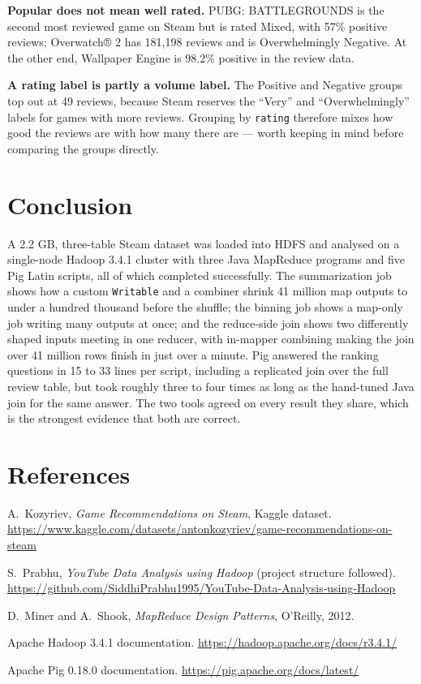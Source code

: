 \documentclass[11pt,a4paper]{article}
\newcommand{\code}[1]{\texttt{#1}}
\begin{document}
\textbf{Popular does not mean well rated.} PUBG: BATTLEGROUNDS is the second most reviewed game on Steam
but is rated Mixed, with 57\% positive reviews; Overwatch® 2 has 181,198 reviews and is Overwhelmingly
Negative. At the other end, Wallpaper Engine is 98.2\% positive in the review data.

\textbf{A rating label is partly a volume label.} The Positive and Negative groups top out at 49 reviews,
because Steam reserves the ``Very'' and ``Overwhelmingly'' labels for games with more reviews. Grouping by
\code{rating} therefore mixes how good the reviews are with how many there are — worth keeping in mind
before comparing the groups directly.

\section{Conclusion}

A 2.2 GB, three-table Steam dataset was loaded into HDFS and analysed on a single-node Hadoop 3.4.1
cluster with three Java MapReduce programs and five Pig Latin scripts, all of which completed
successfully. The summarization job shows how a custom \code{Writable} and a combiner shrink 41 million
map outputs to under a hundred thousand before the shuffle; the binning job shows a map-only job
writing many outputs at once; and the reduce-side join shows two differently shaped inputs meeting in
one reducer, with in-mapper combining making the join over 41 million rows finish in just over a
minute. Pig answered the ranking questions in 15 to 33 lines per script, including a replicated join
over the full review table, but took roughly three to four times as long as the hand-tuned Java join
for the same answer. The two tools agreed on every result they share, which is the strongest evidence
that both are correct.

\enlargethispage{2\baselineskip}  %
\section*{References}
{\footnotesize
\begin{enumerate}[label={[\arabic*]}, itemsep=0pt]
  \item A.\ Kozyriev, \emph{Game Recommendations on Steam}, Kaggle dataset.
        \url{https://www.kaggle.com/datasets/antonkozyriev/game-recommendations-on-steam}
  \item S.\ Prabhu, \emph{YouTube Data Analysis using Hadoop} (project structure followed).
        \url{https://github.com/SiddhiPrabhu1995/YouTube-Data-Analysis-using-Hadoop}
  \item D.\ Miner and A.\ Shook, \emph{MapReduce Design Patterns}, O'Reilly, 2012.
  \item Apache Hadoop 3.4.1 documentation. \url{https://hadoop.apache.org/docs/r3.4.1/}
  \item Apache Pig 0.18.0 documentation. \url{https://pig.apache.org/docs/latest/}
\end{enumerate}}
\end{document}
